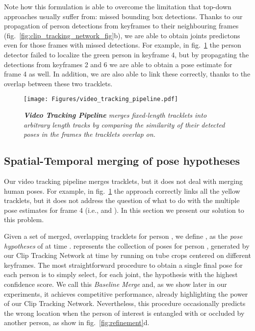 \documentclass[10pt,twocolumn,letterpaper]{article}
\begin{document}
Note how this formulation is able to overcome the limitation that top-down approaches usually suffer from: missed bounding box detections. Thanks to our propagation of person detections from keyframes to their neighbouring frames (fig.~\ref{fig:clip_tracking_network_fig}{\color{red}b}), we are able to obtain joints predictons even for those frames with missed detections. For example, in fig.~\ref{fig:long_video_tracking_fig} the person detector failed to localize the green person in keyframe 4, but by propagating the detections from keyframes 2 and 6 we are able to obtain a pose estimate for frame 4 as well. In addition, we are also able to link these correctly, thanks to the overlap between these two tracklets. 

\begin{figure}
   \texttt{[image: Figures/video\_tracking\_pipeline.pdf]}
   \vspace{-7mm}
   \caption{\small \it {\bf Video Tracking Pipeline} merges fixed-length tracklets into arbitrary length tracks by comparing the similarity of their detected poses in the frames the tracklets overlap on.\vspace{-4mm}}
   \label{fig:long_video_tracking_fig} 
\end{figure}

\subsection{Spatial-Temporal merging of pose hypotheses}\label{sec:refinement}

Our video tracking pipeline merges tracklets, but it does not deal with merging human poses. For example, in fig.~\ref{fig:long_video_tracking_fig} the approach correctly links all the yellow tracklets, but it does not address the question of what to do with the multiple pose estimates for frame 4 (i.e.,  and ). In this section we present our solution to this problem.

Given a set of merged, overlapping tracklets for person , we define {\small }, as the {\it pose hypotheses} of  at time .  represents the collection of poses for person , generated by our Clip Tracking Network at time  by running on tube crops centered on different keyframes. The most straightforward procedure to obtain a single final pose for each person is to simply select, for each joint, the hypothesis  with the highest confidence score. We call this {\it Baseline Merge} and, as we show later in our experiments, it achieves competitive performance, already highlighting the power of our Clip Tracking Network. Nevertheless, this procedure occasionally predicts the wrong location when the person of interest is entangled with or occluded by another person, as show in fig.~\ref{fig:refinement}{\color{red}d}. 
\end{document}
